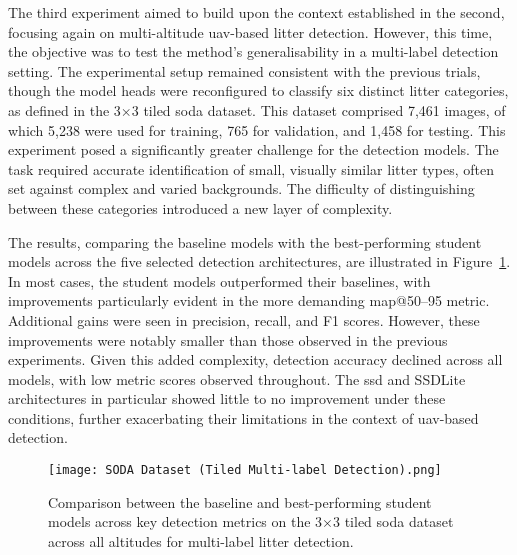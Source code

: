 The third experiment aimed to build upon the context established in the second, focusing again on multi-altitude \gls{uav}-based litter detection. However, this time, the objective was to test the method’s generalisability in a multi-label detection setting. The experimental setup remained consistent with the previous trials, though the model heads were reconfigured to classify six distinct litter categories, as defined in the 3$\times$3 tiled \gls{soda} dataset. This dataset comprised 7,461 images, of which 5,238 were used for training, 765 for validation, and 1,458 for testing.
This experiment posed a significantly greater challenge for the detection models. The task required accurate identification of small, visually similar litter types, often set against complex and varied backgrounds. The difficulty of distinguishing between these categories introduced a new layer of complexity.

The results, comparing the baseline models with the best-performing student models across the five selected detection architectures, are illustrated in Figure~\ref{fig:soda_tiled_multi_bar}. In most cases, the student models outperformed their baselines, with improvements particularly evident in the more demanding \gls{map}@50–95 metric. Additional gains were seen in precision, recall, and F1 scores. However, these improvements were notably smaller than those observed in the previous experiments. Given this added complexity, detection accuracy declined across all models, with low metric scores observed throughout. The \gls{ssd} and SSDLite architectures in particular showed little to no improvement under these conditions, further exacerbating their limitations in the context of \gls{uav}-based detection.

\begin{figure}[!ht]
    \centering
    \texttt{[image: SODA Dataset (Tiled Multi-label Detection).png]}
    \caption{Comparison between the baseline and best-performing student models across key detection metrics on the 3$\times$3 tiled \gls{soda} dataset across all altitudes for multi-label litter detection.}
    \label{fig:soda_tiled_multi_bar}
\end{figure}

